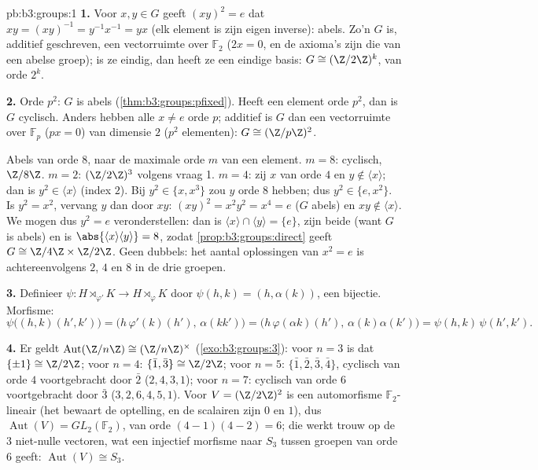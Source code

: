 \begin{solution}{pb:b3:groups:1}
\textbf{1.} Voor $x, y \in G$ geeft $(xy)^2 = e$ dat $xy =
(xy)^{-1} = y^{-1}x^{-1} = yx$ (elk element is zijn eigen inverse):
abels. Zo'n $G$ is, additief geschreven, een vectorruimte over
$\mathbb F_2$ ($2x = 0$, en de axioma's zijn die van een abelse
groep); is ze eindig, dan heeft ze een eindige basis: $G \cong
(\Z/2\Z)^k$, van orde $2^k$.

\textbf{2.} Orde $p^2$: $G$ is abels
(\cref{thm:b3:groups:pfixed}). Heeft een element orde $p^2$, dan is
$G$ cyclisch. Anders hebben alle $x \neq e$ orde $p$; additief is
$G$ dan een vectorruimte over $\mathbb F_p$ ($px = 0$) van dimensie
$2$ ($p^2$ elementen): $G \cong (\Z/p\Z)^2$.

Abels van orde $8$, naar de maximale orde $m$ van een element. $m =
8$: cyclisch, $\Z/8\Z$. $m = 2$: $(\Z/2\Z)^3$ volgens vraag 1. $m =
4$: zij $x$ van orde $4$ en $y \notin \langle x \rangle$; dan is
$y^2 \in \langle x\rangle$ (index $2$). Bij $y^2 \in \{x, x^3\}$
zou $y$ orde $8$ hebben; dus $y^2 \in \{e, x^2\}$. Is $y^2 = x^2$,
vervang $y$ dan door $xy$: $(xy)^2 = x^2y^2 = x^4 = e$ ($G$ abels)
en $xy \notin \langle x\rangle$. We mogen dus $y^2 = e$
veronderstellen: dan is $\langle x \rangle \cap \langle y \rangle =
\{e\}$, zijn beide  (want $G$ is abels) en is $\abs{\langle
x\rangle \langle y\rangle} = 8$, zodat
\cref{prop:b3:groups:direct} geeft $G \cong \Z/4\Z \times \Z/2\Z$.
Geen dubbels: het aantal oplossingen van $x^2 = e$ is
achtereenvolgens $2$, $4$ en $8$ in de drie groepen.

\textbf{3.} Definieer $\psi \colon H \rtimes_{\varphi'} K \to H
\rtimes_{\varphi} K$ door $\psi(h, k) = (h, \alpha(k))$, een
bijectie. Morfisme:
\[
\psi\bigl((h,k)(h',k')\bigr)
= \bigl(h\,\varphi'(k)(h'),\, \alpha(kk')\bigr)
= \bigl(h\,\varphi(\alpha k)(h'),\, \alpha(k)\alpha(k')\bigr)
= \psi(h,k)\,\psi(h',k').
\]

\textbf{4.} Er geldt $\operatorname{Aut}(\Z/n\Z) \cong
(\Z/n\Z)^\times$ (\cref{exo:b3:groups:3}): voor $n = 3$ is dat
$\{\pm 1\} \cong \Z/2\Z$; voor $n = 4$: $\{\bar 1, \bar 3\} \cong
\Z/2\Z$; voor $n = 5$: $\{\bar 1, \bar 2, \bar 3, \bar 4\}$,
cyclisch van orde $4$ voortgebracht door $\bar 2$ ($2, 4, 3, 1$);
voor $n = 7$: cyclisch van orde $6$ voortgebracht door $\bar 3$
($3, 2, 6, 4, 5, 1$). Voor $V = (\Z/2\Z)^2$ is een automorfisme
$\mathbb F_2$-lineair (het bewaart de optelling, en de scalairen
zijn $0$ en $1$), dus $\operatorname{Aut}(V) = GL_2(\mathbb F_2)$,
van orde $(4-1)(4-2) = 6$; die werkt trouw op de $3$ niet-nulle
vectoren, wat een injectief morfisme naar $S_3$ tussen groepen van
orde $6$ geeft: $\operatorname{Aut}(V) \cong S_3$.


\end{solution}
